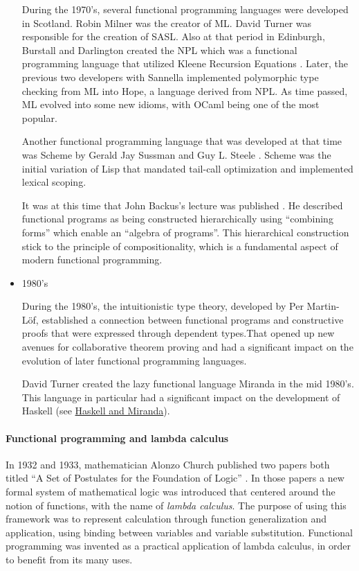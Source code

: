 \documentclass[a4paper, titlepage, twoside]{article}
\begin{document}
\begin{itemize}
During the 1970's, several functional programming languages were developed in Scotland. Robin Milner was the creator of ML. David Turner was responsible for the creation of SASL. Also at that period in Edinburgh, Burstall and Darlington created the NPL which was a functional programming language that utilized Kleene Recursion Equations \autocite{darlingtonProgramTransformationSynthesis1977}. Later, the previous two developers with Sannella implemented polymorphic type checking from ML into Hope, a language derived from NPL. As time passed, ML evolved into some new idioms, with OCaml being one of the most popular.

Another functional programming language that was developed at that time was Scheme by Gerald Jay Sussman and Guy L. Steele \autocite{abelsonRevisedReportAlgorithmic1998}. Scheme was the initial variation of Lisp that mandated tail-call optimization and implemented lexical scoping.

It was at this time that John Backus's lecture was published \autocite{backusCanProgrammingBe1978}. He described functional programs as being constructed hierarchically using ``combining forms'' which enable an ``algebra of programs''. This hierarchical construction stick to the principle of compositionality, which is a fundamental aspect of modern functional programming.

\item 1980's

During the 1980's, the intuitionistic type theory, developed by Per Martin-Löf, established a connection between functional programs and constructive proofs that were expressed through dependent types.That opened up new avenues for collaborative theorem proving and had a significant impact on the evolution of later functional programming languages.

David Turner created the lazy functional language Miranda \autocite{turnerMirandaNonstrictFunctional1985} in the mid 1980's. This language in particular had a significant impact on the development of Haskell (see \hyperref[sec:org855ad6f]{Haskell and Miranda}).
\end{itemize}

\paragraph*{Functional programming and lambda calculus}
\label{sec:orgf1c62de}

In 1932 and 1933, mathematician Alonzo Church published two papers both titled ``A Set of Postulates for the Foundation of Logic'' \autocite{churchSetPostulatesFoundation1932,churchSetPostulatesFoundation1933}. In those papers a new formal system of mathematical logic was introduced that centered around the notion of functions, with the name of \emph{lambda calculus}. The purpose of using this framework was to represent calculation through function generalization and application, using binding between variables and variable substitution. Functional programming was invented as a practical application of lambda calculus, in order to benefit from its many uses.
\end{document}
